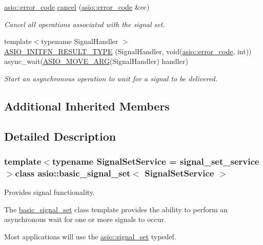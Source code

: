 \begin{DoxyCompactItemize}
\hyperlink{classasio_1_1error__code}{asio\+::error\+\_\+code} \hyperlink{classasio_1_1basic__signal__set_ada73eef842e94bdf5781e0a8cca908a6}{cancel} (\hyperlink{classasio_1_1error__code}{asio\+::error\+\_\+code} \&ec)
\begin{DoxyCompactList}\small\item\em Cancel all operations associated with the signal set. \end{DoxyCompactList}\item 
{\footnotesize template$<$typename Signal\+Handler $>$ }\\\hyperlink{classasio_1_1basic__signal__set_a8843849361bffb409a6c25b0e6f98893}{A\+S\+I\+O\+\_\+\+I\+N\+I\+T\+F\+N\+\_\+\+R\+E\+S\+U\+L\+T\+\_\+\+T\+Y\+P\+E} (Signal\+Handler, void(\hyperlink{classasio_1_1error__code}{asio\+::error\+\_\+code}, int)) async\+\_\+wait(\hyperlink{group__async__read_ga6d72a97784dde9476c6d93b8904a4967}{A\+S\+I\+O\+\_\+\+M\+O\+V\+E\+\_\+\+A\+R\+G}(Signal\+Handler) handler)
\begin{DoxyCompactList}\small\item\em Start an asynchronous operation to wait for a signal to be delivered. \end{DoxyCompactList}\end{DoxyCompactItemize}
\subsection*{Additional Inherited Members}


\subsection{Detailed Description}
\subsubsection*{template$<$typename Signal\+Set\+Service = signal\+\_\+set\+\_\+service$>$class asio\+::basic\+\_\+signal\+\_\+set$<$ Signal\+Set\+Service $>$}

Provides signal functionality. 

The \hyperlink{classasio_1_1basic__signal__set}{basic\+\_\+signal\+\_\+set} class template provides the ability to perform an asynchronous wait for one or more signals to occur.

Most applications will use the \hyperlink{namespaceasio_a4f135fc124cc60e4e00dc2dbb309f354}{asio\+::signal\+\_\+set} typedef.

